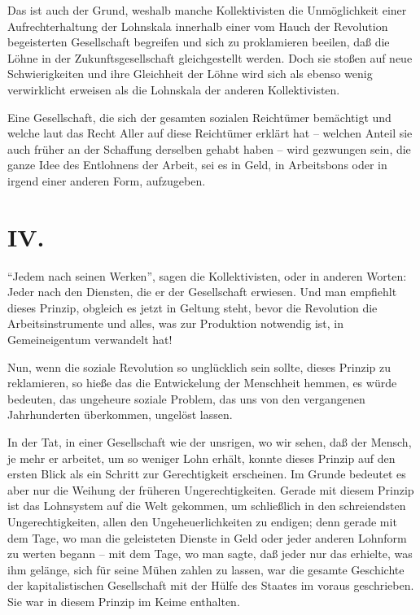 \documentclass{scrbook}
\begin{document}
Das ist auch der Grund, weshalb manche Kollektivisten die Unmöglichkeit einer Aufrechterhaltung der Lohnskala innerhalb einer vom Hauch der Revolution begeisterten Gesellschaft begreifen und sich zu proklamieren beeilen, daß die Löhne in der Zukunftsgesellschaft gleichgestellt werden. Doch sie stoßen auf neue Schwierigkeiten und ihre Gleichheit der Löhne wird sich als ebenso wenig verwirklicht erweisen als die Lohnskala der anderen Kollektivisten.

Eine Gesellschaft, die sich der gesamten sozialen Reichtümer bemächtigt und welche laut das Recht Aller auf diese Reichtümer erklärt hat – welchen Anteil sie auch früher an der Schaffung derselben gehabt haben – wird gezwungen sein, die ganze Idee des Entlohnens der Arbeit, sei es in Geld, in Arbeitsbons oder in irgend einer anderen Form, aufzugeben.

\section*{IV.}

``Jedem nach seinen Werken'', sagen die Kollektivisten, oder in anderen Worten: Jeder nach den Diensten, die er der Gesellschaft erwiesen. Und man empfiehlt dieses Prinzip, obgleich es jetzt in Geltung steht, bevor die Revolution die Arbeitsinstrumente und alles, was zur Produktion notwendig ist, in Gemeineigentum verwandelt hat!

Nun, wenn die soziale Revolution so unglücklich sein sollte, dieses Prinzip zu reklamieren, so hieße das die Entwickelung der Menschheit hemmen, es würde bedeuten, das ungeheure soziale Problem, das uns von den vergangenen Jahrhunderten überkommen, ungelöst lassen.

In der Tat, in einer Gesellschaft wie der unsrigen, wo wir sehen, daß der Mensch, je mehr er arbeitet, um so weniger Lohn erhält, konnte dieses Prinzip auf den ersten Blick als ein Schritt zur Gerechtigkeit erscheinen. Im Grunde bedeutet es aber nur die Weihung der früheren Ungerechtigkeiten. Gerade mit diesem Prinzip ist das Lohnsystem auf die Welt gekommen, um schließlich in den schreiendsten Ungerechtigkeiten, allen den Ungeheuerlichkeiten zu endigen; denn gerade mit dem Tage, wo man die geleisteten Dienste in Geld oder jeder anderen Lohnform zu werten begann – mit dem Tage, wo man sagte, daß jeder nur das erhielte, was ihm gelänge, sich für seine Mühen zahlen zu lassen, war die gesamte Geschichte der kapitalistischen Gesellschaft mit der Hülfe des Staates im voraus geschrieben. Sie war in diesem Prinzip im Keime enthalten.
\end{document}
